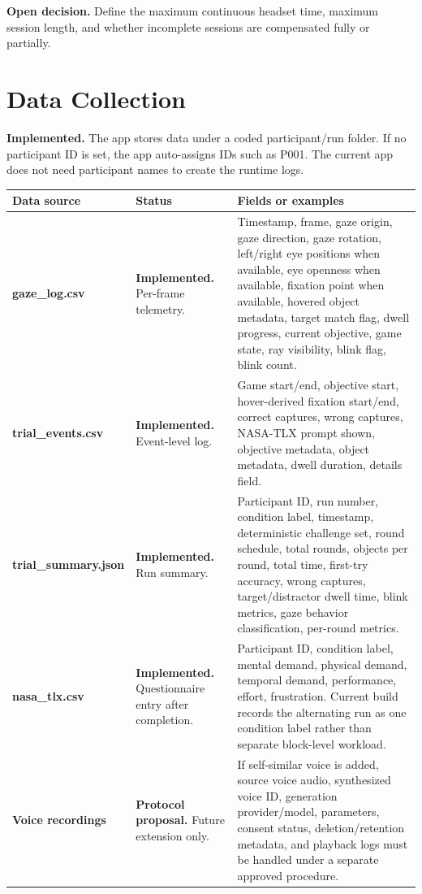\documentclass[11pt,letterpaper]{article}
\newcommand{\status}[1]{\textbf{#1.}}
\newcommand{\field}[1]{\textbf{#1}}
\begin{document}
\status{Open decision} Define the maximum continuous headset time, maximum session length, and whether incomplete sessions are compensated fully or partially.

\section{Data Collection}

\status{Implemented} The app stores data under a coded participant/run folder. If no participant ID is set, the app auto-assigns IDs such as P001. The current app does not need participant names to create the runtime logs.

\begin{longtable}{p{}p{}p{}}
\toprule
\field{Data source} & \field{Status} & \field{Fields or examples} \\
\midrule
\field{gaze\_log.csv} & \status{Implemented} Per-frame telemetry. & Timestamp, frame, gaze origin, gaze direction, gaze rotation, left/right eye positions when available, eye openness when available, fixation point when available, hovered object metadata, target match flag, dwell progress, current objective, game state, ray visibility, blink flag, blink count. \\
\field{trial\_events.csv} & \status{Implemented} Event-level log. & Game start/end, objective start, hover-derived fixation start/end, correct captures, wrong captures, NASA-TLX prompt shown, objective metadata, object metadata, dwell duration, details field. \\
\field{trial\_summary.json} & \status{Implemented} Run summary. & Participant ID, run number, condition label, timestamp, deterministic challenge set, round schedule, total rounds, objects per round, total time, first-try accuracy, wrong captures, target/distractor dwell time, blink metrics, gaze behavior classification, per-round metrics. \\
\field{nasa\_tlx.csv} & \status{Implemented} Questionnaire entry after completion. & Participant ID, condition label, mental demand, physical demand, temporal demand, performance, effort, frustration. Current build records the alternating run as one condition label rather than separate block-level workload. \\
\field{Voice recordings} & \status{Protocol proposal} Future extension only. & If self-similar voice is added, source voice audio, synthesized voice ID, generation provider/model, parameters, consent status, deletion/retention metadata, and playback logs must be handled under a separate approved procedure. \\
\bottomrule
\end{longtable}
\end{document}
